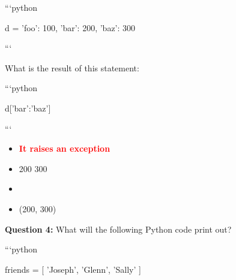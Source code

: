 \documentclass[12pt,a4paper]{article}
\begin{document}
\newline
\newline

\newline
```python\newline

\newline
d = 'foo': 100, 'bar': 200, 'baz': 300\newline

\newline
```\newline

\newline
\newline

\newline
What is the result of this statement:\newline

\newline
\newline

\newline
```python\newline

\newline
d['bar':'baz']\newline

\newline
```

\begin{itemize}
    \item[\textbf{A.}] \textcolor{red}{\textbf{It raises an exception}}
    \item[\textbf{B.}] 200 300
    \item[\textbf{C.}] [200, 300]
    \item[\textbf{D.}] (200, 300)
\end{itemize}

\vspace{0.5cm}

\textbf{Question 4:} What will the following Python code print out?\newline

\newline
\newline

\newline
```python\newline

\newline
friends = [ 'Joseph', 'Glenn', 'Sally' ]\newline
\end{document}
